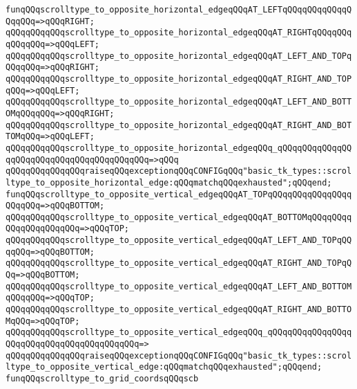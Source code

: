 \newline
\verb|funqQQqscrolltype_to_opposite_horizontal_edgeqQQqAT_LEFTqQQqqQQqqQQqqQQqqQQq=>qQQqRIGHT;|\newline
\verb|qQQqqQQqqQQqscrolltype_to_opposite_horizontal_edgeqQQqAT_RIGHTqQQqqQQqqQQqqQQq=>qQQqLEFT;|\newline
\verb|qQQqqQQqqQQqscrolltype_to_opposite_horizontal_edgeqQQqAT_LEFT_AND_TOPqQQqqQQq=>qQQqRIGHT;|\newline
\verb|qQQqqQQqqQQqscrolltype_to_opposite_horizontal_edgeqQQqAT_RIGHT_AND_TOPqQQq=>qQQqLEFT;|\newline
\verb|qQQqqQQqqQQqscrolltype_to_opposite_horizontal_edgeqQQqAT_LEFT_AND_BOTTOMqQQqqQQq=>qQQqRIGHT;|\newline
\verb|qQQqqQQqqQQqscrolltype_to_opposite_horizontal_edgeqQQqAT_RIGHT_AND_BOTTOMqQQq=>qQQqLEFT;|\newline
\verb|qQQqqQQqqQQqscrolltype_to_opposite_horizontal_edgeqQQq_qQQqqQQqqQQqqQQqqQQqqQQqqQQqqQQqqQQqqQQqqQQq=>qQQq|\newline
\verb|qQQqqQQqqQQqqQQqraiseqQQqexceptionqQQqCONFIGqQQq"basic_tk_types::scrolltype_to_opposite_horizontal_edge:qQQqmatchqQQqexhausted";qQQqend;|\newline
\newline
\verb|funqQQqscrolltype_to_opposite_vertical_edgeqQQqAT_TOPqQQqqQQqqQQqqQQqqQQqqQQq=>qQQqBOTTOM;|\newline
\verb|qQQqqQQqqQQqscrolltype_to_opposite_vertical_edgeqQQqAT_BOTTOMqQQqqQQqqQQqqQQqqQQqqQQq=>qQQqTOP;|\newline
\verb|qQQqqQQqqQQqscrolltype_to_opposite_vertical_edgeqQQqAT_LEFT_AND_TOPqQQqqQQq=>qQQqBOTTOM;|\newline
\verb|qQQqqQQqqQQqscrolltype_to_opposite_vertical_edgeqQQqAT_RIGHT_AND_TOPqQQq=>qQQqBOTTOM;|\newline
\verb|qQQqqQQqqQQqscrolltype_to_opposite_vertical_edgeqQQqAT_LEFT_AND_BOTTOMqQQqqQQq=>qQQqTOP;|\newline
\verb|qQQqqQQqqQQqscrolltype_to_opposite_vertical_edgeqQQqAT_RIGHT_AND_BOTTOMqQQq=>qQQqTOP;|\newline
\verb|qQQqqQQqqQQqscrolltype_to_opposite_vertical_edgeqQQq_qQQqqQQqqQQqqQQqqQQqqQQqqQQqqQQqqQQqqQQqqQQq=>|\newline
\verb|qQQqqQQqqQQqqQQqraiseqQQqexceptionqQQqCONFIGqQQq"basic_tk_types::scrolltype_to_opposite_vertical_edge:qQQqmatchqQQqexhausted";qQQqend;|\newline
\newline
\verb|funqQQqscrolltype_to_grid_coordsqQQqscb|\newline
